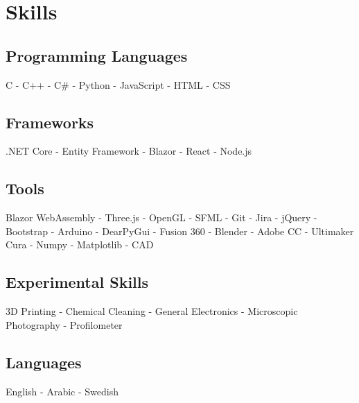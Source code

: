 \documentclass{article}
\begin{document}
\hfill

\newpage 
\begin{minipage}[t]{1\textwidth}
    \section{Skills}
    
    \subsection{Programming Languages}
    \vspace{-0.5em} %
    \normalsize{C - C++ - C\# - Python - JavaScript - HTML - CSS}
    \vspace{0.5em} %
    
    \subsection{Frameworks}
   \vspace{-0.5em} %
    \normalsize{.NET Core - Entity Framework - Blazor - React - Node.js}
    \vspace{0.5em} %
    
    \subsection{Tools}
    \vspace{-0.5em} %
    \normalsize{Blazor WebAssembly - Three.js - OpenGL - SFML - Git - Jira - jQuery - Bootstrap - Arduino - DearPyGui - Fusion 360 - Blender - Adobe CC - Ultimaker Cura - Numpy - Matplotlib - CAD} 
    \vspace{0.5em} %

    \subsection{Experimental Skills}
    \vspace{-0.5em} %
    \normalsize{3D Printing - Chemical Cleaning - General Electronics - Microscopic Photography - Profilometer}
    \vspace{0.5em} %
 
    \subsection{Languages}
    \vspace{-0.5em} %
    \normalsize{English - Arabic - Swedish}
    \vspace{0.5em} %
\end{minipage}
\end{document}
